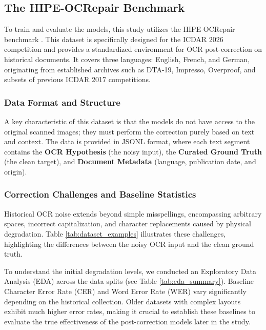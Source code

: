 \documentclass[11pt]{extarticle}
\begin{document}
\subsection{The HIPE-OCRepair Benchmark}
To train and evaluate the models, this study utilizes the HIPE-OCRepair benchmark \cite{hipe_ocrepair_2026}. This dataset is specifically designed for the ICDAR 2026 competition and provides a standardized environment for OCR post-correction on historical documents. It covers three languages: English, French, and German, originating from established archives such as DTA-19, Impresso, Overproof, and subsets of previous ICDAR 2017 competitions.

\subsubsection{Data Format and Structure}
A key characteristic of this dataset is that the models do not have access to the original scanned images; they must perform the correction purely based on text and context. The data is provided in JSONL format, where each text segment contains the \textbf{OCR Hypothesis} (the noisy input), the \textbf{Curated Ground Truth} (the clean target), and \textbf{Document Metadata} (language, publication date, and origin).

\subsubsection{Correction Challenges and Baseline Statistics}
Historical OCR noise extends beyond simple misspellings, encompassing arbitrary spaces, incorrect capitalization, and character replacements caused by physical degradation. Table \ref{tab:dataset_examples} illustrates these challenges, highlighting the differences between the noisy OCR input and the clean ground truth. 

To understand the initial degradation levels, we conducted an Exploratory Data Analysis (EDA) across the data splits (see Table \ref{tab:eda_summary}). Baseline Character Error Rate (CER) and Word Error Rate (WER) vary significantly depending on the historical collection. Older datasets with complex layouts exhibit much higher error rates, making it crucial to establish these baselines to evaluate the true effectiveness of the post-correction models later in the study.
\end{document}
